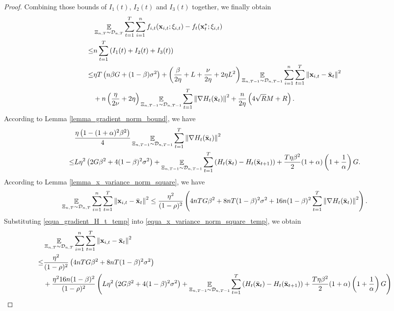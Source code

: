\documentclass{article}
\begin{document}
\begin{proof}
Combining those bounds of $I_1(t)$, $I_2(t)$ and $I_3(t)$ together, we finally obtain
\begin{align}
\nonumber
& \mathop{\mathbb{E}}_{ \Xi_{n,T} \sim \mathcal{D}_{n,T} } \sum_{t=1}^T\sum_{i=1}^n f_{i,t}({\bf x}_{i,t};\xi_{i,t}) - f_t({\bf x}_t^\ast;\xi_{i,t}) \\ \nonumber
\le & n \sum_{t=1}^T \left(  I_1(t) + I_2(t) + I_3(t)  \right) \\ \nonumber
\le & \eta T \left(  n\beta G + (1-\beta)\sigma^2 \right) + \left( \frac{\beta}{2\eta } +L + \frac{\nu}{2\eta} + 2\eta L^2  \right) \mathop{\mathbb{E}}_{ \Xi_{n,T-1} \sim \mathcal{D}_{n,T-1} }\sum_{i=1}^n \sum_{t=1}^T \left\lVert{\bf x}_{i,t} - \bar{{\bf x}}_t\right\rVert^2  \\ \label{equa_theorem_i123_temp}
& + n\left(  \frac{\eta}{2\nu} + 2\eta  \right)\mathop{\mathbb{E}}_{ \Xi_{n,T-1} \sim \mathcal{D}_{n,T-1} }\sum_{t=1}^T\left\lVert\nabla H_t(\bar{{\bf x}}_t)\right\rVert^2  + \frac{n}{2\eta}\left(  4\sqrt{R}M + R   \right).
\end{align}  
According to Lemma \ref{lemma_gradient_norm_bound}, we have
\begin{align}
\nonumber
& \frac{\eta\left(  1-(1+\alpha)^2\beta^2  \right)}{4} \mathop{\mathbb{E}}_{ \Xi_{n,T-1} \sim \mathcal{D}_{n,T-1} }\sum_{t=1}^T\left\lVert\nabla H_t(\bar{{\bf x}}_t)\right\rVert^2 \\ \label{equa_gradient_H_t_temp}
\le &  L\eta^2 \left(  2G\beta^2  +  4(1-\beta)^2 \sigma^2  \right)  + \mathop{\mathbb{E}}_{ \Xi_{n,T-1} \sim \mathcal{D}_{n,T-1} } \sum_{t=1}^T \left(  H_t(\bar{{\bf x}}_t) -  H_t(\bar{{\bf x}}_{t+1})  \right) + \frac{T \eta \beta^2}{2} (1+\alpha) \left( 1+\frac{1}{\alpha} \right)  G.
\end{align} According to Lemma \ref{lemma_x_variance_norm_square}, we have
\begin{align}
\label{equa_x_variance_norm_square_temp}
\mathop{\mathbb{E}}_{ \Xi_{n,T} \sim \mathcal{D}_{n,T} } \sum_{i=1}^n\sum_{t=1}^T \left\lVert{\bf x}_{i,t} - \bar{{\bf x}}_t\right\rVert^2 \le \frac{\eta^2}{(1-\rho)^2} \left(  4nTG\beta^2  +  8nT(1-\beta)^2 \sigma^2 + 16n(1-\beta)^2 \sum_{t=1}^T \left\lVert\nabla H_t(\bar{{\bf x}}_t)\right\rVert^2  \right).
\end{align} Substituting \eqref{equa_gradient_H_t_temp} into \eqref{equa_x_variance_norm_square_temp}, we obtain
\begin{align}
\nonumber
& \mathop{\mathbb{E}}_{ \Xi_{n,T} \sim \mathcal{D}_{n,T} } \sum_{i=1}^n\sum_{t=1}^T \left\lVert{\bf x}_{i,t} - \bar{{\bf x}}_t\right\rVert^2 \\ \nonumber 
\le & \frac{\eta^2}{(1-\rho)^2} \left(  4nTG\beta^2  +  8nT(1-\beta)^2 \sigma^2  \right) \\ \nonumber 
& + \frac{\eta^2 16n(1-\beta)^2}{(1-\rho)^2}  \left(  L\eta^2 \left(  2G\beta^2  +  4(1-\beta)^2 \sigma^2  \right)  + \mathop{\mathbb{E}}_{ \Xi_{n,T-1} \sim \mathcal{D}_{n,T-1} } \sum_{t=1}^T \left(  H_t(\bar{{\bf x}}_t) -  H_t(\bar{{\bf x}}_{t+1})  \right) + \frac{T \eta \beta^2}{2} (1+\alpha) \left( 1+\frac{1}{\alpha} \right)  G   \right) 
\end{align}











\end{proof}
\end{document}
